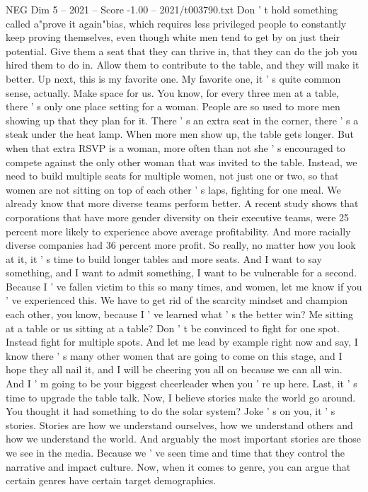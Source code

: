 \begin{textsample}{NEG Dim 5 – 2021 – Score -1.00 – 2021/t003790.txt}
Don ' t hold something called a"prove it again"bias, which requires less privileged people to constantly keep proving themselves, even though white men tend to get by on just their potential.
Give them a seat that they can thrive in, that they can do the job you hired them to do in.
Allow them to contribute to the table, and they will make it better.
Up next, this is my favorite one.
My favorite one, it ' s quite common sense, actually.
Make space for us.
You know, for every three men at a table, there ' s only one place setting for a woman.
People are so used to more men showing up that they plan for it.
There ' s an extra seat in the corner, there ' s a steak under the heat lamp.
When more men show up, the table gets longer.
But when that extra RSVP is a woman, more often than not she ' s encouraged to compete against the only other woman that was invited to the table.
Instead, we need to build multiple seats for multiple women, not just one or two, so that women are not sitting on top of each other ' s laps, fighting for one meal.
We already know that more diverse teams perform better.
A recent study shows that corporations that have more gender diversity on their executive teams, were 25 percent more likely to experience above average profitability.
And more racially diverse companies had 36 percent more profit.
So really, no matter how you look at it, it ' s time to build longer tables and more seats.
And I want to say something, and I want to admit something, I want to be vulnerable for a second.
Because I ' ve fallen victim to this so many times, and women, let me know if you ' ve experienced this.
We have to get rid of the scarcity mindset and champion each other, you know, because I ' ve learned what ' s the better win?
Me sitting at a table or us sitting at a table?
Don ' t be convinced to fight for one spot.
Instead fight for multiple spots.
And let me lead by example right now and say, I know there ' s many other women that are going to come on this stage, and I hope they all nail it, and I will be cheering you all on because we can all win.
And I ' m going to be your biggest cheerleader when you ' re up here.
Last, it ' s time to upgrade the table talk.
Now, I believe stories make the world go around.
You thought it had something to do the solar system?
Joke ' s on you, it ' s stories.
Stories are how we understand ourselves, how we understand others and how we understand the world.
And arguably the most important stories are those we see in the media.
Because we ' ve seen time and time that they control the narrative and impact culture.
Now, when it comes to genre, you can argue that certain genres have certain target demographics.

\end{textsample}
